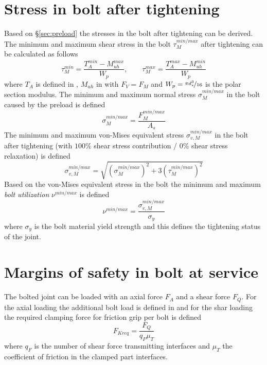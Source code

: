 \section{Stress in bolt after tightening}
\label{sec:stresses}
Based on §\ref{sec:preload} the stresses in the bolt after tightening can be derived. 
The minimum and maximum shear stress in the bolt $\tau_M^{min/max}$ after tightening can be calculated
as follows
\begin{equation}
  \tau_M^{min} = \frac{T_A^{min}-M_{uh}^{max}}{W_p} , \qquad \tau_M^{max} = \frac{T_A^{max}-M_{uh}^{min}}{W_p}
  \label{equ:tau_M}
\end{equation}
where $T_A$ is defined in , $M_{uh}$ in  with $F_V=F_M$ and 
$W_p = \nicefrac{\pi d_s^3}{16}$ is the polar section modulus. The minimum and maximum normal 
stress $\sigma_M^{min/max}$ in the bolt caused by the preload is defined
\begin{equation}
  \sigma_M^{min/max} = \frac{F_M^{min/max}}{A_s}
  \label{equ:sig_M}
\end{equation}
The minimum and maximum von-Mises equivalent stress $\sigma_{v,M}^{min/max}$ in the bolt after tightening
(with $100\%$ shear stress contribution / $0\%$ shear stress relaxation) is defined 
\begin{equation}
  \sigma_{v,M}^{min/max} = \sqrt{\left(\sigma_M^{min/max}\right)^2 + 3\left(\tau_M^{min/max}\right)^2}
  \label{equ:sig_vM}
\end{equation}
Based on the von-Mises equivalent stress in the bolt the minimum and maximum 
\emph{bolt utilization} $\nu^{min/max}$ is defined
\begin{equation}
  \nu^{min/max} = \frac{\sigma_{v,M}^{min/max}}{\sigma_y}
  \label{equ:nu}
\end{equation}
where $\sigma_y$ is the bolt material yield strength and this defines the tightening status of the joint. 

\section{Margins of safety in bolt at service}
The bolted joint can be loaded with an axial force $F_A$ and a shear force $F_Q$. For
the axial loading the additional bolt load is defined in  and for the shar loading
the required clamping force for friction grip per bolt is defined 
\begin{equation}
  F_{Kreq} = \frac{F_Q}{q_F \mu_T}
\end{equation}
where $q_F$ is the number of shear force transmitting interfaces and $\mu_T$ the coefficient of 
friction in the clamped part interfaces. 
